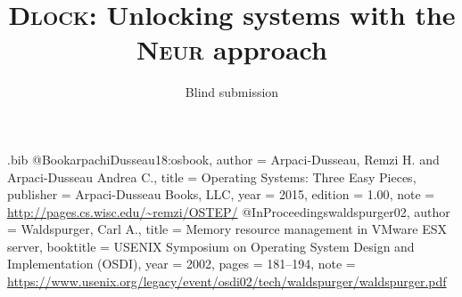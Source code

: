 \usepackage{filecontents}

\begin{filecontents}{\jobname.bib}
@Book{arpachiDusseau18:osbook,
  author =       {Arpaci-Dusseau, Remzi H. and Arpaci-Dusseau Andrea C.},
  title =        {Operating Systems: Three Easy Pieces},
  publisher =    {Arpaci-Dusseau Books, LLC},
  year =         2015,
  edition =      {1.00},
  note =         {\url{http://pages.cs.wisc.edu/~remzi/OSTEP/}}
}
@InProceedings{waldspurger02,
  author =       {Waldspurger, Carl A.},
  title =        {Memory resource management in {VMware ESX} server},
  booktitle =    {USENIX Symposium on Operating System Design and
                  Implementation (OSDI)},
  year =         2002,
  pages =        {181--194},
  note =         {\url{https://www.usenix.org/legacy/event/osdi02/tech/waldspurger/waldspurger.pdf}}}
\end{filecontents}

\newcommand{\solname}{\textsc{Dlock}\xspace}
\newcommand{\neurl}{\textsc{Neutral recombine}\xspace}
\newcommand{\neur}{\textsc{Neur}\xspace}



\date{}

\title{\solname: Unlocking systems with the \neur approach}

\author{
{\rm Blind submission}
} %


